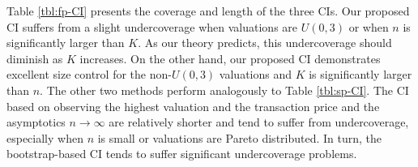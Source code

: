 Table \ref{tbl:fp-CI} presents the coverage and length of the three CIs. Our proposed CI suffers from a slight undercoverage when valuations are $U(0,3)$ or when $n$ is significantly larger than $K$. As our theory predicts, this undercoverage should diminish as $K$ increases. On the other hand, our proposed CI demonstrates excellent size control for the non-$U(0,3)$ valuations and $K$ is significantly larger than $n$. The other two methods perform analogously to Table \ref{tbl:sp-CI}. The CI based on observing the highest valuation and the transaction price and the asymptotics $n\to \infty$ are relatively shorter and tend to suffer from undercoverage, especially when $n$ is small or valuations are Pareto distributed. In turn, the bootstrap-based CI tends to suffer significant undercoverage problems. 


